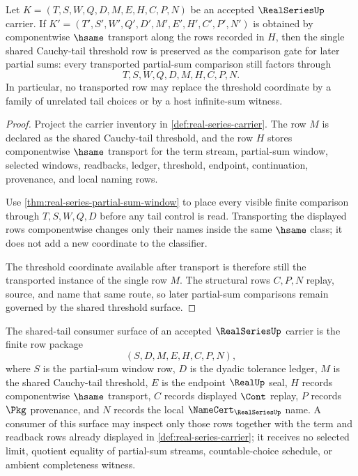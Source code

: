 \begin{theorem}\label{thm:real-series-tail-threshold-stability}
Let $K=(T,S,W,Q,D,M,E,H,C,P,N)$ be an accepted $\RealSeriesUp$ carrier. If $K'=(T',S',W',Q',D',M',E',H',C',P',N')$ is obtained by componentwise $\hsame$ transport along the rows recorded in $H$, then the single shared Cauchy-tail threshold row is preserved as the comparison gate for later partial sums: every transported partial-sum comparison still factors through
$$
T,S,W,Q,D,M,H,C,P,N.
$$
In particular, no transported row may replace the threshold coordinate by a family of unrelated tail choices or by a host infinite-sum witness.
\end{theorem}
\begin{proof}
Project the carrier inventory in \autoref{def:real-series-carrier}. The row $M$ is declared as the shared Cauchy-tail threshold, and the row $H$ stores componentwise $\hsame$ transport for the term stream, partial-sum window, selected windows, readbacks, ledger, threshold, endpoint, continuation, provenance, and local naming rows.

Use \autoref{thm:real-series-partial-sum-window} to place every visible finite comparison through $T,S,W,Q,D$ before any tail control is read. Transporting the displayed rows componentwise changes only their names inside the same $\hsame$ class; it does not add a new coordinate to the classifier.

The threshold coordinate available after transport is therefore still the transported instance of the single row $M$. The structural rows $C,P,N$ replay, source, and name that same route, so later partial-sum comparisons remain governed by the shared threshold surface.
\end{proof}

\begin{definition}\label{def:real-series-shared-tail-consumer-surface}
The shared-tail consumer surface of an accepted $\RealSeriesUp$ carrier is the finite row package
$$
(S,D,M,E,H,C,P,N),
$$
where $S$ is the partial-sum window row, $D$ is the dyadic tolerance ledger, $M$ is the shared Cauchy-tail threshold, $E$ is the endpoint $\RealUp$ seal, $H$ records componentwise $\hsame$ transport, $C$ records displayed $\Cont$ replay, $P$ records $\Pkg$ provenance, and $N$ records the local $\NameCert_{\RealSeriesUp}$ name. A consumer of this surface may inspect only those rows together with the term and readback rows already displayed in \autoref{def:real-series-carrier}; it receives no selected limit, quotient equality of partial-sum streams, countable-choice schedule, or ambient completeness witness.
\end{definition}

